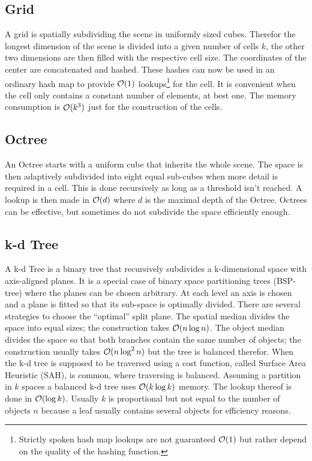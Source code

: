\subsection{Grid}
A grid is spatially subdividing the scene in uniformly sized cubes. Therefor the longest dimension of the scene is divided into a given number of cells $k$, the other two dimensions are then filled with the respective cell size. The coordinates of the center are concatenated and hashed. These hashes can now be used in an ordinary hash map to provide $\mathcal{O}(1)$ lookups\footnote{Strictly spoken hash map lookups are not guaranteed $\mathcal{O}(1)$ but rather depend on the quality of the hashing function.} for the cell. It is convenient when the cell only contains a constant number of elements, at best one. The memory consumption is $\mathcal{O}(k^3)$ just for the construction of the cells.

\subsection{Octree}

An Octree starts with a uniform cube that inherits the whole scene. The space is then adaptively subdivided into eight equal sub-cubes when more detail is required in a cell. This is done recursively as long as a threshold isn't reached. A lookup is then made in $\mathcal{O}(d)$ where $d$ is the maximal depth of the Octree. Octrees can be effective, but sometimes do not subdivide the space efficiently enough.

\subsection{k-d Tree}

A k-d Tree is a binary tree that recursively subdivides a k-dimensional space with axis-aligned planes. It is a special case of binary space partitioning trees (BSP-tree) where the planes can be chosen arbitrary. At each level an axis is chosen and a plane is fitted so that its sub-space is optimally divided. There are several strategies to choose the \enquote{optimal} split plane. The spatial median divides the space into equal sizes; the construction takes $\mathcal{O}(n\log n)$. The object median divides the space so that both branches contain the same number of objects; the construction usually takes $\mathcal{O}(n \log^2 n)$ but the tree is balanced therefor. When the k-d tree is supposed to be traversed using a cost function, called Surface Area Heuristic (SAH), is common, where traversing is balanced. Assuming a partition in $k$ spaces a balanced k-d tree uses $\mathcal{O}(k \log k)$ memory. The lookup thereof is done in $\mathcal{O}(\log k)$. Usually $k$ is proportional but not equal to the number of objects $n$ because a leaf usually contains several objects for efficiency reasons.

